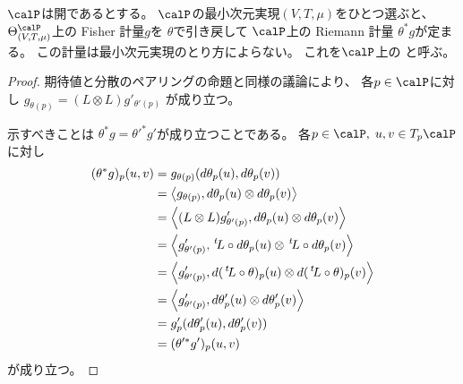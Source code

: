 \documentclass[report]{jlreq}
\begin{document}
\begin{propdef}
    $\calP$は開であるとする。
    $\calP$の最小次元実現$(V, T, \mu)$をひとつ選ぶと、
    $\Theta^\calP_{(V, T, \mu)}$上の Fisher 計量$g$を
    $\theta$で引き戻して
    $\calP$上の Riemann 計量
    $\theta^* g$が定まる。
    この計量は最小次元実現のとり方によらない。
    これを$\calP$上の
    と呼ぶ。
\end{propdef}

\begin{proof}
    期待値と分散のペアリングの命題と同様の議論により、
    各$p \in \calP$に対し
    $g_{\theta(p)} = (L \otimes L) g'_{\theta'(p)}$
    が成り立つ。

    示すべきことは
    $\theta^* g = \theta'^* g'$が成り立つことである。
    各$p \in \calP, \; u, v \in T_p\calP$に対し
    \begin{alignat}{1}
        (\theta^* g)_p(u, v)
            &=
                g_{\theta(p)} (d\theta_p(u), d\theta_p(v))
                \\
            &=
                \left\langle{
                    g_{\theta(p)}
                },{
                    d\theta_p(u) \otimes d\theta_p(v)
                }\right\rangle
                \\
            &=
                \left\langle{
                    (L \otimes L) g'_{\theta'(p)}
                },{
                    d\theta_p(u) \otimes d\theta_p(v)
                }\right\rangle
                \\
            &=
                \left\langle{
                    g'_{\theta'(p)}
                },{
                    \,{}^{t}\!L \circ d\theta_p(u) \otimes \,{}^{t}\!L \circ d\theta_p(v)
                }\right\rangle
                \\
            &=
                \left\langle{
                    g'_{\theta'(p)}
                },{
                    d(\,{}^{t}\!L \circ \theta)_p (u) \otimes d(\,{}^{t}\!L \circ \theta)_p (v)
                }\right\rangle
                \\
            &=
                \left\langle{
                    g'_{\theta'(p)}
                },{
                    d\theta'_p (u) \otimes d\theta'_p (v)
                }\right\rangle
                \\
            &=
                g'_p (d\theta'_p(u), d\theta'_p(v))
                \\
            &=
                (\theta'^* g')_p(u, v)
    \end{alignat}
    が成り立つ。
\end{proof}
\end{document}
